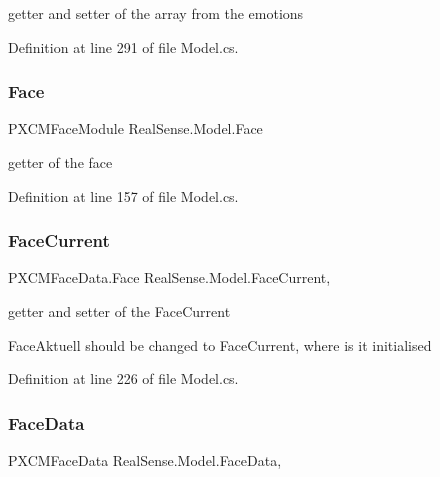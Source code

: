 getter and setter of the array from the emotions 

Definition at line 291 of file Model.\+cs.

\mbox{\label{class_real_sense_1_1_model_abb8701f1030ca1e3bfd226a9ad352da5}} 
\subsubsection{\texorpdfstring{Face}{Face}}
{\footnotesize\ttfamily P\+X\+C\+M\+Face\+Module Real\+Sense.\+Model.\+Face\hspace{0.3cm}{\ttfamily [get]}}

getter of the face 

Definition at line 157 of file Model.\+cs.

\mbox{\label{class_real_sense_1_1_model_ad94686a4be9a84dd3ccd2522624644f6}} 
\subsubsection{\texorpdfstring{Face\+Current}{FaceCurrent}}
{\footnotesize\ttfamily P\+X\+C\+M\+Face\+Data.\+Face Real\+Sense.\+Model.\+Face\+Current\hspace{0.3cm}{\ttfamily [get]}, {\ttfamily [set]}}

getter and setter of the Face\+Current

Face\+Aktuell should be changed to Face\+Current, where is it initialised 

Definition at line 226 of file Model.\+cs.

\mbox{\label{class_real_sense_1_1_model_a0d16c2536a9f3c346cc3d51b3227989e}} 
\subsubsection{\texorpdfstring{Face\+Data}{FaceData}}
{\footnotesize\ttfamily P\+X\+C\+M\+Face\+Data Real\+Sense.\+Model.\+Face\+Data\hspace{0.3cm}{\ttfamily [get]}, {\ttfamily [set]}}

